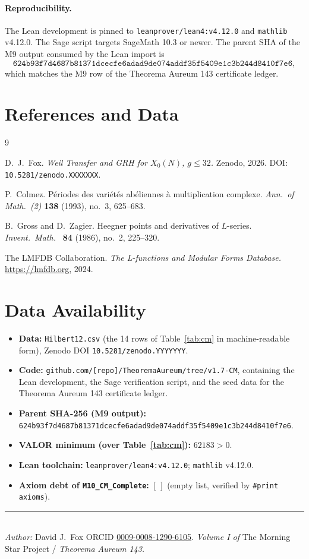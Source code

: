 \documentclass[11pt]{article}
\begin{document}
\paragraph{Reproducibility.} The Lean development is pinned to
\texttt{leanprover/lean4:v4.12.0} and \texttt{mathlib} v4.12.0. The
Sage script targets SageMath 10.3 or newer. The parent SHA of the M9
output consumed by the Lean import is
\[
\texttt{624b93f7d4687b81371dcecfe6adad9de074addf35f5409e1c3b244d8410f7e6},
\]
which matches the M9 row of the Theorema Aureum 143 certificate ledger.

\newpage

\section*{References and Data}

\begin{thebibliography}{9}

D.\ J.\ Fox.
\newblock \emph{Weil Transfer and GRH for $X_0(N)$, $g \le 32$.}
\newblock Zenodo, 2026.
\newblock DOI: \texttt{10.5281/zenodo.XXXXXXX}.

P.\ Colmez.
\newblock P\'eriodes des vari\'et\'es ab\'eliennes \`a multiplication
complexe.
\newblock \emph{Ann.\ of Math.\ (2)} \textbf{138} (1993), no.~3,
625--683.

B.\ Gross and D.\ Zagier.
\newblock Heegner points and derivatives of $L$-series.
\newblock \emph{Invent.\ Math.\ } \textbf{84} (1986), no.~2, 225--320.

The LMFDB Collaboration.
\newblock \emph{The L-functions and Modular Forms Database.}
\newblock \url{https://lmfdb.org}, 2024.

\end{thebibliography}

\section*{Data Availability}

\begin{itemize}
  \item \textbf{Data:} \texttt{Hilbert12.csv} (the 14 rows of
    Table~\ref{tab:cm} in machine-readable form), Zenodo
    DOI \texttt{10.5281/zenodo.YYYYYYY}.
  \item \textbf{Code:}
    \texttt{github.com/[repo]/TheoremaAureum/tree/v1.7-CM}, containing
    the Lean development, the Sage verification script, and the seed
    data for the Theorema Aureum 143 certificate ledger.
  \item \textbf{Parent SHA-256 (M9 output):} \\
    \texttt{624b93f7d4687b81371dcecfe6adad9de074addf35f5409e1c3b244d8410f7e6}.
  \item \textbf{VALOR minimum (over Table~\ref{tab:cm}):} $62183 > 0$.
  \item \textbf{Lean toolchain:} \texttt{leanprover/lean4:v4.12.0};
    \texttt{mathlib} v4.12.0.
  \item \textbf{Axiom debt of \texttt{M10\_CM\_Complete}:} $[\,]$
    (empty list, verified by \texttt{\#print axioms}).
\end{itemize}

\bigskip
\noindent\rule{\linewidth}{0.4pt}\\
\small\textit{Author:} David J.\ Fox \quad ORCID
\href{https://orcid.org/0009-0008-1290-6105}{0009-0008-1290-6105}.\quad
\textit{Volume I of} The Morning Star Project / \textit{Theorema Aureum 143.}
\end{document}
